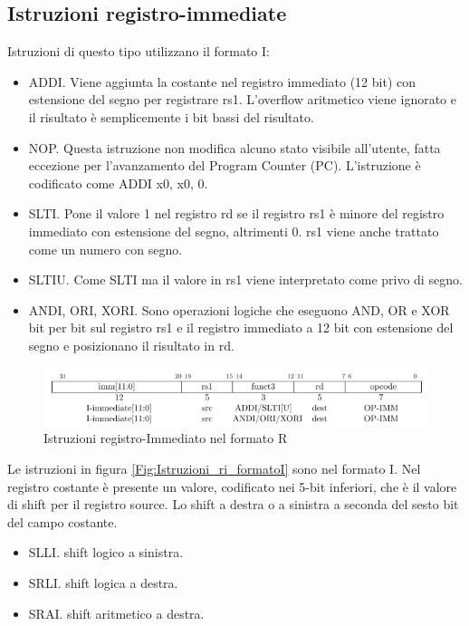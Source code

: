 \documentclass[12pt,a4paper]{report}
\begin{document}
\subsection{Istruzioni registro-immediate}
Istruzioni di questo tipo utilizzano il formato I:
\begin{itemize}
	\item ADDI.  Viene aggiunta la costante nel registro immediato (12 bit) con estensione del segno per registrare rs1. L'overflow aritmetico viene ignorato e il risultato è semplicemente i bit bassi del risultato.
 \item NOP. Questa istruzione non modifica alcuno stato visibile all'utente, fatta eccezione per l'avanzamento del Program Counter (PC). L'istruzione è codificato come ADDI x0, x0, 0.
 \item SLTI.  Pone il valore 1 nel registro rd se il registro rs1 è minore del registro immediato con estensione del segno, altrimenti 0. rs1 viene anche trattato come un numero con segno.
\item SLTIU.  Come SLTI ma il valore in rs1 viene interpretato come privo di segno.
\item ANDI, ORI, XORI. Sono operazioni logiche che eseguono AND, OR e XOR bit per bit sul registro rs1 e il registro immediato a 12 bit con estensione del segno e posizionano il risultato in rd.
\end{itemize}

\begin{figure}
	\includegraphics[width = \textwidth]{Istruzioni/Istruction1.png}
	\caption{Istruzioni registro-Immediato nel formato R}
	\label{Fig:Istruzioni_ri_formatoR}
\end{figure}


Le istruzioni in figura \ref{Fig:Istruzioni_ri_formatoI} sono nel formato I. Nel registro costante è presente un valore, codificato nei 5-bit inferiori,  che è il valore di shift per il registro source. Lo shift a destra o a sinistra a seconda del sesto bit del campo costante.
\begin{itemize}
	\item  SLLI. shift logico a sinistra.
	\item SRLI. shift logica a destra.
	\item SRAI. shift aritmetico a destra.
\end{itemize}
\end{document}
